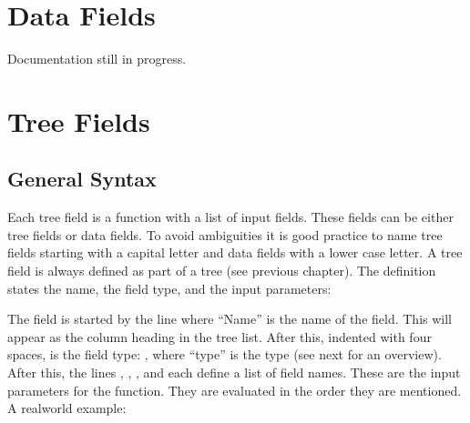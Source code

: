 \documentclass[letterpaper,10pt,english]{sphinxmanual}
\begin{document}
\sphinxstepscope


\chapter{Data Fields}
\label{\detokenize{data-fields:data-fields}}\label{\detokenize{data-fields::doc}}
\sphinxAtStartPar
Documentation still in progress.

\sphinxstepscope


\chapter{Tree Fields}
\label{\detokenize{tree-fields:tree-fields}}\label{\detokenize{tree-fields::doc}}

\section{General Syntax}
\label{\detokenize{tree-fields:general-syntax}}
\sphinxAtStartPar
Each tree field is a function with a list of input fields. These fields can be either tree fields or data fields. To avoid ambiguities it is good practice to name tree fields starting with a capital letter and data fields with a lower case letter. A tree field is always defined as part of a tree (see previous chapter). The definition states the name, the field type, and the input parameters:

\begin{sphinxVerbatim}[commandchars=\\\{\}]
 
     
     \PYG{p}{[}\PYG{p}{]}
     \PYG{p}{[}\PYG{p}{]}
     \PYG{p}{[}\PYG{p}{]}
     \PYG{p}{[}\PYG{p}{]}
\end{sphinxVerbatim}

\sphinxAtStartPar
The field is started by the line  where “Name” is the name of the field. This will appear as the column heading in the tree list.
After this, indented with four spaces, is the field type: , where “type” is the type (see next for an overview).
After this, the lines , , , and  each define a list of field names. These are the input parameters for the function. They are evaluated in the order they are mentioned. A real\sphinxhyphen{}world example:
\end{document}

